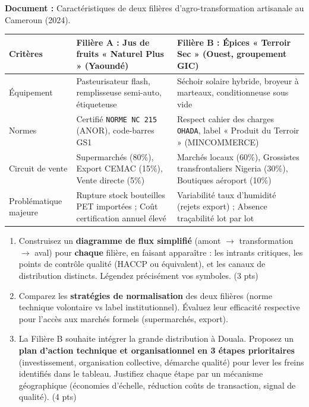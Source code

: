 \documentclass[11pt]{article}
\begin{document}
\begin{exercice}
\textbf{Document :} Caractéristiques de deux filières d'agro-transformation artisanale au Cameroun (2024).

\begin{tabularx}{\linewidth}{>{\raggedright\arraybackslash}X>{\raggedright\arraybackslash}X>{\raggedright\arraybackslash}X}
\toprule
\textbf{Critères} & \textbf{Filière A : Jus de fruits « Naturel Plus » (Yaoundé)} & \textbf{Filière B : Épices « Terroir Sec » (Ouest, groupement GIC)} \\
\midrule
Équipement & Pasteurisateur flash, remplisseuse semi-auto, étiqueteuse & Séchoir solaire hybride, broyeur à marteaux, conditionneuse sous vide \\
Normes & Certifié \texttt{NORME NC 215} (ANOR), code-barres GS1 & Respect cahier des charges \texttt{OHADA}, label « Produit du Terroir » (MINCOMMERCE) \\
Circuit de vente & Supermarchés (80\%), Export CEMAC (15\%), Vente directe (5\%) & Marchés locaux (60\%), Grossistes transfrontaliers Nigeria (30\%), Boutiques aéroport (10\%) \\
Problématique majeure & Rupture stock bouteilles PET importées ; Coût certification annuel élevé & Variabilité taux d'humidité (rejets export) ; Absence traçabilité lot par lot \\
\bottomrule
\end{tabularx}

\begin{enumerate}
    \item Construisez un \textbf{diagramme de flux simplifié} (amont $\rightarrow$ transformation $\rightarrow$ aval) pour \textbf{chaque} filière, en faisant apparaître : les intrants critiques, les points de contrôle qualité (HACCP ou équivalent), et les canaux de distribution distincts. Légendez précisément vos symboles. (3 pts)
    \item Comparez les \textbf{stratégies de normalisation} des deux filières (norme technique volontaire vs label institutionnel). Évaluez leur efficacité respective pour l'accès aux marchés formels (supermarchés, export).
    \item La Filière B souhaite intégrer la grande distribution à Douala. Proposez un \textbf{plan d'action technique et organisationnel en 3 étapes prioritaires} (investissement, organisation collective, démarche qualité) pour lever les freins identifiés dans le tableau. Justifiez chaque étape par un mécanisme géographique (économies d'échelle, réduction coûts de transaction, signal de qualité). (4 pts)
\end{enumerate}
\end{exercice}
\end{document}
